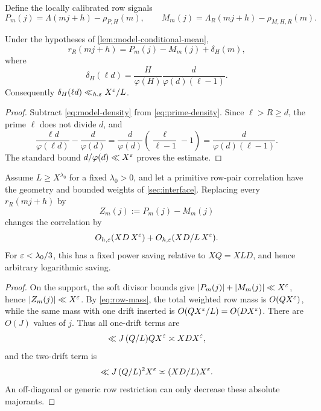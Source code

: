 Define the locally calibrated row signals
\begin{equation}
 P_m(j)=\Lambda(mj+h)-\rho_{P,H}(m),
 \qquad
 M_m(j)=\Lambda_R(mj+h)-\rho_{M,H,R}(m).
 \label{eq:centered-signals}
\end{equation}

\begin{proposition}
\label{prop:matched-centering}
Under the hypotheses of \cref{lem:model-conditional-mean},
\begin{equation}
 r_R(mj+h)=P_m(j)-M_m(j)+\delta_H(m),
 \label{eq:matched-centering}
\end{equation}
where
\begin{equation}
 \boxed{\quad
 \delta_H(\ell d)
 =\frac{H}{\varphi(H)}
 \frac{d}{\varphi(d)(\ell-1)}.
 \quad}
 \label{eq:row-drift}
\end{equation}
Consequently \(\delta_H(\ell d)\ll_{h,\varepsilon}X^\varepsilon/L\).
\end{proposition}

\begin{proof}
Subtract \eqref{eq:model-density} from \eqref{eq:prime-density}.  Since
\(\ell>R\ge d\), the prime \(\ell\) does not divide \(d\), and
\[
 \frac{\ell d}{\varphi(\ell d)}-
 \frac d{\varphi(d)}
 =\frac d{\varphi(d)}\left(\frac\ell{\ell-1}-1\right)
 =\frac d{\varphi(d)(\ell-1)}.
\]
The standard bound \(d/\varphi(d)\ll X^\varepsilon\) proves the estimate.
\end{proof}

\begin{theorem}
\label{thm:drift-small}
Assume \(L\ge X^{\lambda_0}\) for a fixed \(\lambda_0>0\), and let a
primitive row-pair correlation have the geometry and bounded weights of
\cref{sec:interface}.  Replacing every \(r_R(mj+h)\) by
\begin{equation}
 Z_m(j):=P_m(j)-M_m(j)
 \label{eq:Z}
\end{equation}
changes the correlation by
\begin{equation}
 O_{h,\varepsilon}(XD\,X^\varepsilon)+O_{h,\varepsilon}(XD/L\,X^\varepsilon).
 \label{eq:drift-correlation-error}
\end{equation}
For \(\varepsilon<\lambda_0/3\), this has a fixed power saving relative to
\(XQ=XLD\), and hence arbitrary logarithmic saving.
\end{theorem}

\begin{proof}
On the support, the soft divisor bounds give
\(|P_m(j)|+|M_m(j)|\ll X^\varepsilon\), hence \(|Z_m(j)|\ll X^\varepsilon\).
By \eqref{eq:row-mass}, the total weighted row mass is \(O(QX^\varepsilon)\),
while the same mass with one drift inserted is
\(O(QX^\varepsilon/L)=O(DX^\varepsilon)\).  There are \(O(J)\) values of \(j\).
Thus all one-drift terms are
\[
 \ll J\,(Q/L)QX^\varepsilon\asymp XDX^\varepsilon,
\]
and the two-drift term is
\[
 \ll J\,(Q/L)^2X^\varepsilon\asymp (XD/L)X^\varepsilon.
\]
An off-diagonal or generic row restriction can only decrease these
absolute majorants.
\end{proof}

